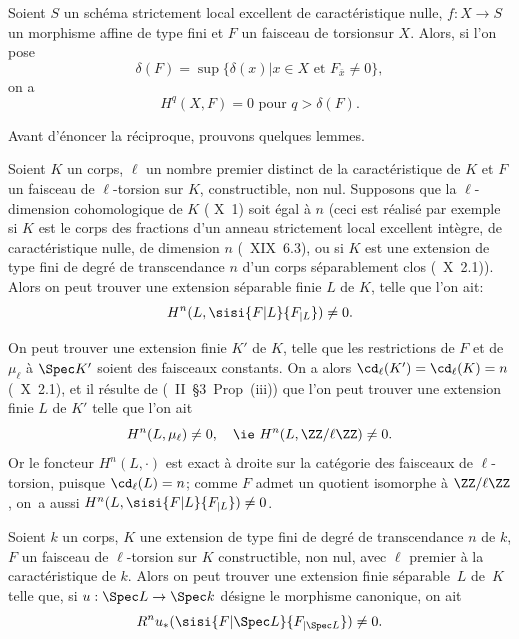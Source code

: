 Soient $S$ un sch\'ema strictement local excellent de caract\'eristique nulle, $f:X\to S$ un morphisme affine de type fini et $F$ un faisceau de torsion\pageoriginale sur $X$. Alors, si l'on pose
$$
\delta(F)=\sup\{\delta(x)|x\in X \text{ et } F_{\bar{x}} \neq 0\},
$$
on a
$$
H^q(X, F)=0 \text{ pour } q>\delta(F).
$$

Avant d'\'enoncer la r\'eciproque, prouvons quelques lemmes.

\begin{lemme} \label{XIV.3.2} Soient $K$ un corps, $\ell$ un nombre premier distinct de la caract\'eristique de $K$ et $F$ un faisceau de $\ell$-torsion sur $K$, constructible, non nul. Supposons que la $\ell$-dimension cohomologique de $K$ (\textup{ X~1}) soit \'egal \`a $n$ (ceci est r\'ealis\'e par exemple si $K$ est le corps des fractions d'un anneau strictement local excellent int\`egre, de caract\'eristique nulle, de dimension $n$ (\textup{~XIX~6.3}), ou si $K$ est une extension de type fini de degr\'e de transcendance $n$ d'un corps s\'eparablement clos (\textup{~X~2.1})). Alors on peut trouver une extension s\'eparable finie $L$ de $K$, telle que l'on ait:
$$H^n(L, \sisi{F{|L}}{F_{|L}}) \neq 0.
$$
\end{lemme}

On peut trouver une extension finie $K'$ de $K$, telle que les restrictions de $F$ et de $\mu_\ell$ \`a $\Spec K'$ soient des faisceaux constants. On a alors $\cd_{\ell}(K') = \cd_{\ell}(K) = n$ (~X~2.1), et il r\'esulte de (\cite{XIV.2}~II~\S 3~Prop~\textup{(iii)}) que l'on peut trouver une extension finie $L$ de $K'$ telle que l'on ait\pageoriginale
$$
H^n(L, \mu_{\ell})\neq 0, \quad\text {\ie } H^n(L, \ZZ/\ell\ZZ) \neq 0.
$$
Or le foncteur $H^n(L,\cdot)$ est exact \`a droite sur la cat\'egorie des faisceaux de $\ell$-torsion, puisque $\cd_{\ell}(L)=n$; comme $F$ admet un quotient isomorphe \`a $\ZZ/\ell\ZZ$, on~a aussi $H^n(L, \sisi{F{|L}}{F_{|L}}) \neq 0$.

\begin{corollaire} \label{XIV.3.3}
Soient $k$ un corps, $K$ une extension de type fini de degr\'e de transcendance $n$ de $k$, $F$ un faisceau de $\ell$-torsion sur $K$ constructible, non nul, avec $\ell$ premier \`a la caract\'eristique de $k$. Alors on peut trouver une extension finie s\'eparable~$L$ de~$K$ telle que, si $u: \Spec L \to \Spec k$ d\'esigne le morphisme canonique, on ait
$$R^n u_*(\sisi{F{|\Spec L}}{F_{|\Spec L}}) \neq 0.
$$
\end{corollaire}

